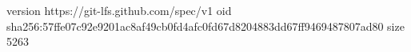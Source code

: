 version https://git-lfs.github.com/spec/v1
oid sha256:57ffe07c92e9201ac8af49cb0fd4afc0fd67d8204883dd67ff9469487807ad80
size 5263
